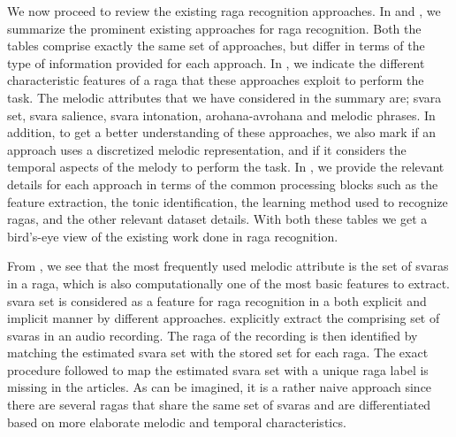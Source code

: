 We now proceed to review the existing \gls{raga} recognition approaches. In  and , we summarize the prominent existing approaches for \gls{raga} recognition. Both the tables comprise exactly the same set of approaches, but differ in terms of the type of information provided for each approach. In , we indicate the different characteristic features of a \gls{raga} that these approaches exploit to perform the task. The melodic attributes that we have considered in the summary are; \gls{svara} set, \gls{svara} salience, \gls{svara} intonation, \gls{arohana}-\gls{avrohana} and melodic phrases. In addition, to get a better understanding of these approaches, we also mark if an approach uses a discretized melodic representation, and if it considers the temporal aspects of the melody to perform the task. In , we provide the relevant details for each approach in terms of the common processing blocks such as the feature extraction, the tonic identification, the learning method used to recognize \glspl{raga}, and the other relevant dataset details. With both these tables we get a bird's-eye view of the existing work done in \gls{raga} recognition.

From , we see that the most frequently used melodic attribute is the set of \glspl{svara} in a \gls{raga}, which is also computationally one of the most basic features to extract. \Gls{svara} set is considered as a feature for \gls{raga} recognition in a both explicit and implicit manner by different approaches. \cite{chakraborty2012object,ranjani2011carnatic} explicitly extract the comprising set of \glspl{svara} in an audio recording. The \gls{raga} of the recording is then identified by matching the estimated \gls{svara} set with the stored set for each \gls{raga}. The exact procedure followed to map the estimated \gls{svara} set with a unique \gls{raga} label is missing in the articles. As can be imagined, it is a rather naive approach since there are several \glspl{raga} that share the same set of \glspl{svara} and are differentiated based on more elaborate melodic and temporal characteristics.

